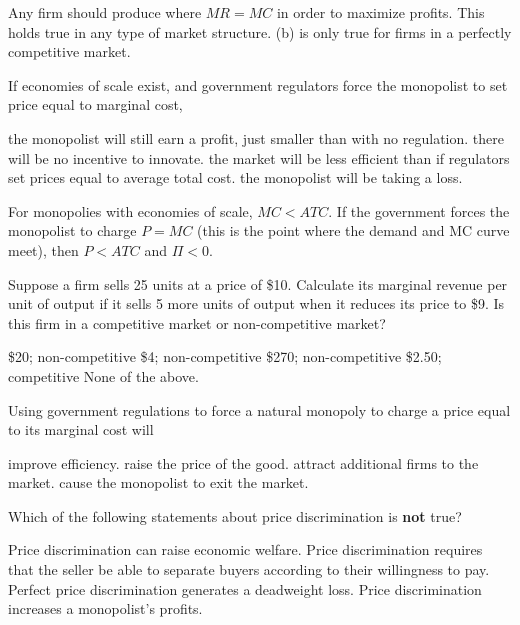 \documentclass[addpoints,11pt]{exam}
\theoremstyle{definition}
\begin{document}
\begin{questions}
	\begin{solution}
		Any firm should produce where $MR = MC$ in order to maximize profits. This holds true in any type of market structure. (b) is only true for firms in a perfectly competitive market.
	\end{solution}
	
	
	\question If economies of scale exist, and government regulators force the monopolist to set price equal to marginal cost,
	
	\begin{choices}
		\choice the monopolist will still earn a profit, just smaller than with no regulation.
		\choice there will be no incentive to innovate.
		\choice the market will be less efficient than if regulators set prices equal to average total cost.
		\CorrectChoice the monopolist will be taking a loss.
	\end{choices}
	
	\begin{solution}
		For monopolies with economies of scale, $MC < ATC$. If the government forces the monopolist to charge $P=MC$ (this is the point where the demand and MC curve meet), then $P<ATC$ and $\Pi <0$.
	\end{solution}
	
\question Suppose a firm sells 25 units at a price of \$10. Calculate its marginal revenue per unit of output if it sells 5 more units of output when it reduces its price to \$9. Is this firm in a  competitive market or non-competitive market?

\begin{choices}
	\choice \$20; non-competitive
	\CorrectChoice \$4; non-competitive
	\choice \$270; non-competitive
	\choice \$2.50; competitive
	\choice None of the above.
\end{choices}

\question Using government regulations to force a natural monopoly to charge a price equal to its marginal cost will

\begin{choices}
	\choice improve efficiency.
	\choice raise the price of the good.
	\choice attract additional firms to the market.
	\CorrectChoice cause the monopolist to exit the market.
\end{choices}

\question Which of the following statements about price discrimination is \textbf{not} true?

\begin{choices}
	\choice Price discrimination can raise economic welfare.
	\choice Price discrimination requires that the seller be able to separate buyers according to their willingness to pay.
	\CorrectChoice Perfect price discrimination generates a deadweight loss.
	\choice Price discrimination increases a monopolist's profits.
\end{choices}


\end{questions}
\end{document}
